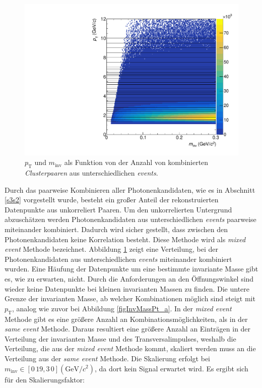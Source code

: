 \begin{figure}[tp]
\centering
\includegraphics[width=.7\linewidth]{hInvMass_pT_Bkg.pdf}
\caption{$p_\text{T}$ und $m_\text{inv}$ als Funktion von der Anzahl von kombinierten  \textit{Clusterpaaren} aus unterschiedlichen \textit{events}.}
\label{figInvMassPt_b}
\end{figure}
Durch das paarweise Kombinieren aller Photonenkandidaten, wie es in Abschnitt \ref{s3s2} vorgestellt wurde, besteht ein großer Anteil der rekonstruierten Datenpunkte aus unkorreliert Paaren.
Um den unkorrelierten Untergrund abzuschätzen werden Photonenkandidaten aus unterschiedlichen \textit{events} paarweise miteinander kombiniert.
Dadurch wird sicher gestellt, dass zwischen den Photonenkandidaten keine Korrelation besteht.
Diese Methode wird als \textit{mixed event} Methode bezeichnet.
Abbildung \ref{figInvMassPt_b} zeigt eine Verteilung, bei der Photonenkandidaten aus unterschiedlichen \textit{events} miteinander kombiniert wurden.
Eine Häufung der Datenpunkte um eine bestimmte invariante Masse gibt es, wie zu erwarten, nicht.
Durch die Anforderungen an den Öffnungswinkel sind wieder keine Datenpunkte bei kleinen invarianten Massen zu finden.
Die untere Grenze der invarianten Masse, ab welcher Kombinationen möglich sind steigt mit $p_\text{T}$, analog wie zuvor bei Abbildung  \ref{figInvMassPt_a}.
\newline
In der \textit{mixed event} Methode gibt es eine größere Anzahl an Kombinationsmöglichkeiten, als in der \textit{same event} Methode.
Daraus resultiert eine größere Anzahl an Einträgen in der Verteilung der invarianten Masse und des Transversalimpulses, weshalb die Verteilung, die aus der \textit{mixed event} Methode kommt, skaliert werden muss an die Verteilung aus der \textit{same event} Methode.
Die Skalierung erfolgt bei $m_\text{inv} \in \left[0\,19,3\,0\right] (\text{GeV/}c^{2})$, da dort kein Signal erwartet wird.
Es ergibt sich für den Skalierungsfaktor:
